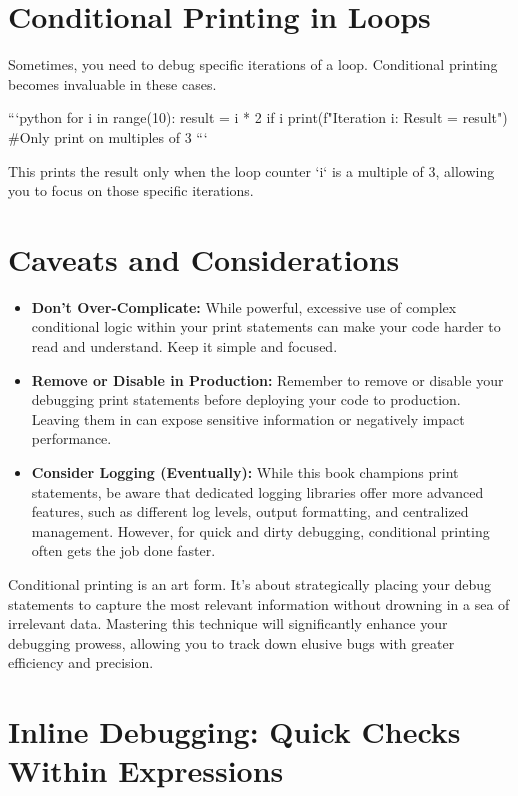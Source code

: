 \documentclass{article}
\begin{document}
\section*{Conditional Printing in Loops}

Sometimes, you need to debug specific iterations of a loop.  Conditional printing becomes invaluable in these cases.

```python
for i in range(10):
  result = i * 2
  if i %
    print(f"Iteration {i}: Result = {result}") #Only print on multiples of 3
```

This prints the result only when the loop counter `i` is a multiple of 3, allowing you to focus on those specific iterations.

\section*{Caveats and Considerations}

\begin{itemize}
    \item \textbf{Don't Over-Complicate:} While powerful, excessive use of complex conditional logic within your print statements can make your code harder to read and understand. Keep it simple and focused.
    \item \textbf{Remove or Disable in Production:} Remember to remove or disable your debugging print statements before deploying your code to production. Leaving them in can expose sensitive information or negatively impact performance.
    \item \textbf{Consider Logging (Eventually):} While this book champions print statements, be aware that dedicated logging libraries offer more advanced features, such as different log levels, output formatting, and centralized management.  However, for quick and dirty debugging, conditional printing often gets the job done faster.
\end{itemize}

Conditional printing is an art form.  It's about strategically placing your debug statements to capture the most relevant information without drowning in a sea of irrelevant data. Mastering this technique will significantly enhance your debugging prowess, allowing you to track down elusive bugs with greater efficiency and precision.

\newpage

\section*{Inline Debugging: Quick Checks Within Expressions} %
\label{chapter-1-5-Inline_Debugging__Quick_Checks_Within_Ex}
\end{document}
